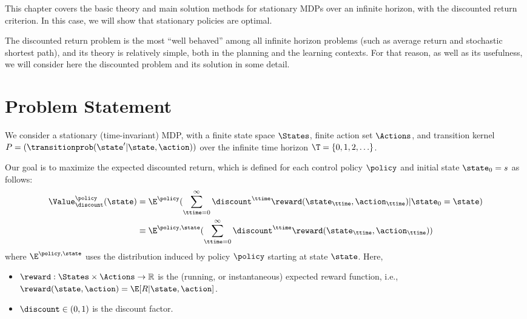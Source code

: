 This chapter covers the basic theory and main solution methods for
stationary MDPs over an infinite horizon, with the discounted return
criterion. In this case, we will show that stationary policies are
optimal.

The discounted return problem is the most ``well behaved'' among all
infinite horizon problems (such as average return and stochastic
shortest path), and its theory is relatively simple, both in
the planning and the learning contexts. For that reason, as well as
its usefulness, we will consider here the discounted problem and its
solution in some detail.


\section{Problem Statement} \label{sec:inf_horizon_prob}

We consider a stationary (time-invariant) MDP, with a finite state
space $\States$, finite action set $\Actions$, and transition kernel
$P = (\transitionprob(\state'|\state,\action))$ over the infinite time horizon
${\T} = \{ 0,1,2, \ldots \} $.

Our goal is to maximize the expected discounted return, which is
defined for each control policy $\policy $ and initial state
${\state_0} = s$ as follows:
\begin{align*}
\Value_\discount ^\policy (\state) &= {\E^\policy }(\sum\limits_{\ttime = 0}^\infty  {{\discount ^\ttime}\reward({\state_\ttime},{\action_\ttime})} |{\state_0} = \state)\\
 &\equiv {\E^{\policy ,\state}}(\sum\limits_{\ttime = 0}^\infty  {{\discount ^\ttime}\reward({\state_\ttime},{\action_\ttime})} )
\end{align*}
where $\E^{\policy ,\state}$ uses the distribution induced by policy
$\policy$ starting at state $\state$. Here,
\begin{itemize}
  \item $\reward : \States \times \Actions \to \mathbb R$ is the (running, or instantaneous) expected reward function, i.e., $\reward(\state,\action)=\E[R|\state,\action]$.
  \item $\discount  \in (0,1)$ is the discount factor.
\end{itemize}


